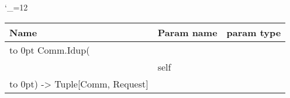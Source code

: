 \begingroup \catcode`\_=12 \tt
\begin{tabular}{lll}
\toprule
\textrm{Name}&\textrm{Param name}&\textrm{param type}\\
\midrule
\hbox to 0pt {Comm.Idup(\hss}\\
& self\\
\hbox to 0pt{) -> Tuple[Comm, Request]\hss}\\
\bottomrule
\end{tabular}
\endgroup
